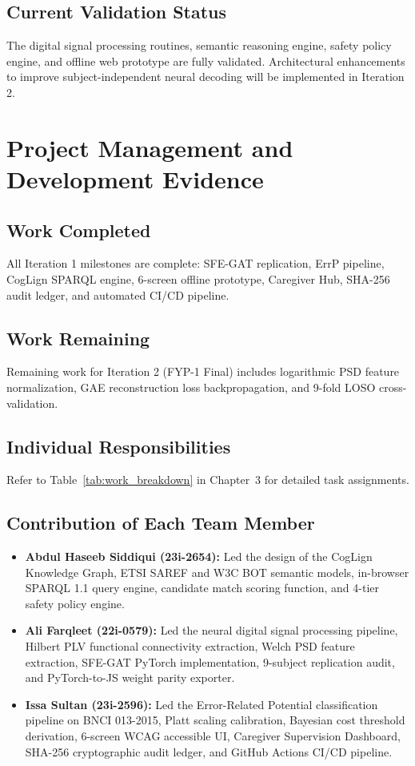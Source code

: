 \documentclass[12pt,a4paper]{report}
\begin{document}
\section{Current Validation Status}
The digital signal processing routines, semantic reasoning engine, safety policy engine, and offline web prototype are fully validated. Architectural enhancements to improve subject-independent neural decoding will be implemented in Iteration 2.

\chapter{Project Management and Development Evidence}

\section{Work Completed}
All Iteration 1 milestones are complete: SFE-GAT replication, ErrP pipeline, CogLign SPARQL engine, 6-screen offline prototype, Caregiver Hub, SHA-256 audit ledger, and automated CI/CD pipeline.

\section{Work Remaining}
Remaining work for Iteration 2 (FYP-1 Final) includes logarithmic PSD feature normalization, GAE reconstruction loss backpropagation, and 9-fold LOSO cross-validation.

\section{Individual Responsibilities}
Refer to Table~\ref{tab:work_breakdown} in Chapter~3 for detailed task assignments.

\section{Contribution of Each Team Member}
\begin{itemize}[leftmargin=1.5em]
    \item \textbf{Abdul Haseeb Siddiqui (23i-2654):} Led the design of the CogLign Knowledge Graph, ETSI SAREF and W3C BOT semantic models, in-browser SPARQL 1.1 query engine, candidate match scoring function, and 4-tier safety policy engine.
    \item \textbf{Ali Farqleet (22i-0579):} Led the neural digital signal processing pipeline, Hilbert PLV functional connectivity extraction, Welch PSD feature extraction, SFE-GAT PyTorch implementation, 9-subject replication audit, and PyTorch-to-JS weight parity exporter.
    \item \textbf{Issa Sultan (23i-2596):} Led the Error-Related Potential classification pipeline on BNCI 013-2015, Platt scaling calibration, Bayesian cost threshold derivation, 6-screen WCAG accessible UI, Caregiver Supervision Dashboard, SHA-256 cryptographic audit ledger, and GitHub Actions CI/CD pipeline.
\end{itemize}
\end{document}

